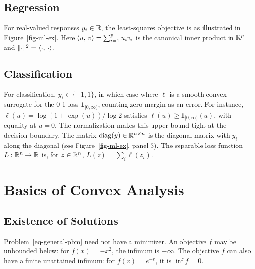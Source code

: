 \subsection{Regression}

For real-valued responses $y_i\in\mathbb{R}$, the least-squares objective is
as illustrated in Figure~\ref{fig-ml-ex}.
%
Here $\langle u,\,v\rangle=\sum_{i=1}^p u_i v_i$ is the canonical inner product in $\mathbb{R}^p$ and $\lVert\cdot\rVert^2=\langle \cdot,\,\cdot\rangle$. 


\subsection{Classification}

For classification, $y_i \in \{-1,1\}$, in which case
where $\ell$ is a smooth convex surrogate for the 0-1 loss $\mathbf{1}_{[0,\infty)}$, counting zero margin as an error.
%
For instance, $\ell(u)=\log(1+\exp(u))/\log 2$ satisfies $\ell(u)\geq\mathbf{1}_{[0,\infty)}(u)$, with equality at $u=0$. The normalization makes this upper bound tight at the decision boundary. The matrix $\operatorname{diag}(y) \in \mathbb{R}^{n \times n}$ is the diagonal matrix with $y_i$ along the diagonal (see Figure~\ref{fig-ml-ex}, panel 3). The separable loss function $L:\mathbb{R}^n\rightarrow\mathbb{R}$ is, for $z \in \mathbb{R}^n$, $L(z)=\sum_i \ell(z_i)$.


\section{Basics of Convex Analysis}

\subsection{Existence of Solutions}

Problem~\eqref{eq-general-pbm} need not have a minimizer. An objective $f$ may be unbounded below: for $f(x)=-x^2$, the infimum is $-\infty$. The objective $f$ can also have a finite unattained infimum: for $f(x)=e^{-x}$, it is $\inf f=0$.

